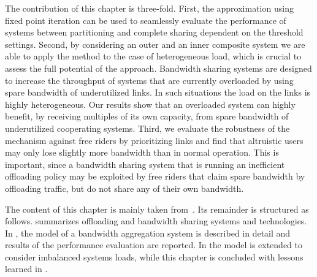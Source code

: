 
The contribution of this chapter is three-fold.
First, the approximation using fixed point iteration can be used to seamlessly evaluate the performance of systems between partitioning and complete sharing dependent on the threshold settings.
Second, by considering an outer and an inner composite system we are able to apply the method to the case of heterogeneous load, which is crucial to assess the full potential of the approach.
Bandwidth sharing systems are designed to increase the throughput of systems that are currently overloaded by using spare bandwidth of underutilized links.
In such situations the load on the links is highly heterogeneous.
Our results show that an overloaded system can highly benefit, by receiving multiples of its own capacity, from spare bandwidth of underutilized cooperating systems.
Third, we evaluate the robustness of the mechanism against free riders by prioritizing links and find that altruistic users may only lose slightly more bandwidth than in normal operation.
This is important, since a bandwidth sharing system that is running an inefficient offloading policy may be exploited by free riders that claim spare bandwidth by offloading traffic, but do not share any of their own bandwidth.

The content of this chapter is mainly taken from~\cite{burger2016phycom,burger2017im}.
Its remainder is structured as follows.
 summarizes offloading and bandwidth sharing systems and technologies.
In , the model of a bandwidth aggregation system is described in detail and results of the performance evaluation are reported. In  the model is extended to consider imbalanced systems loads, while this chapter is concluded with lessons learned in .


% 



